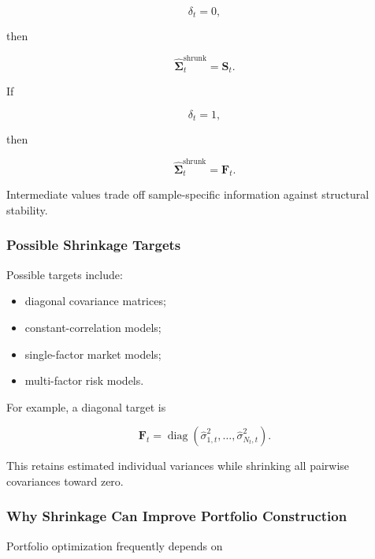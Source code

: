 \documentclass[11pt,a4paper]{article}
\begin{document}
\begin{equation}
\delta_t=0,
\end{equation}

then

\begin{equation}
\widehat{\boldsymbol{\Sigma}}_t^{\mathrm{shrunk}}
=
\mathbf{S}_t.
\end{equation}

If

\begin{equation}
\delta_t=1,
\end{equation}

then

\begin{equation}
\widehat{\boldsymbol{\Sigma}}_t^{\mathrm{shrunk}}
=
\mathbf{F}_t.
\end{equation}

Intermediate values trade off sample-specific information against structural
stability.


\subsubsection{Possible Shrinkage Targets}

Possible targets include:

\begin{itemize}
    \item diagonal covariance matrices;
    \item constant-correlation models;
    \item single-factor market models;
    \item multi-factor risk models.
\end{itemize}

For example, a diagonal target is

\begin{equation}
\boxed{
\mathbf{F}_t
=
\operatorname{diag}
\left(
\widehat{\sigma}_{1,t}^{2},
\ldots,
\widehat{\sigma}_{N_t,t}^{2}
\right).
}
\end{equation}

This retains estimated individual variances while shrinking all pairwise
covariances toward zero.


\subsubsection{Why Shrinkage Can Improve Portfolio Construction}

Portfolio optimization frequently depends on
\end{document}
